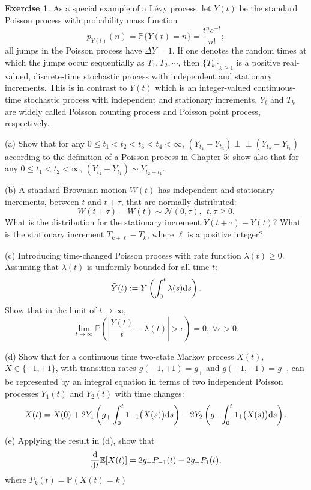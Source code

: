 \documentclass[12pt]{article}
\newcommand{\Prob}{\mathbb{P}}
\newcommand{\Expect}{\mathbb{E}}
\def\rd{{\rm d}}
\theoremstyle{definition}
\newtheorem{exer}{Exercise}
\theoremstyle{remark}
\def\d{{\rm d}}
\begin{document}
\begin{exer}
    As a special example of a L\'{e}vy process,
let $Y(t)$ be the standard Poisson process with probability 
mass function
\[
            p_{Y(t)}(n) =\mathbb{P}\big\{ Y(t) = n\big\} 
          =  \frac{ t^n e^{-t} }{n!};
\]
all jumps in the Poisson process have $\Delta Y = 1$.
If one denotes the random times at which the jumps
occur sequentially as $T_1, T_2,\cdots$, then $\{T_k\}_{k\ge 1}$
is a positive real-valued, discrete-time stochastic process with
independent and stationary increments.  This is in contrast to $Y(t)$ which is an integer-valued continuous-time stochastic process with 
independent and stationary increments.  $Y_t$ and $T_k$ are 
widely called Poisson counting process and Poisson point
process, respectively.

(a) Show that for any $0\le t_1 <  t_2 < t_3 < t_4 < \infty$,
$(Y_{t_4}-Y_{t_3}) \perp \!\!\! \perp (Y_{t_2}-Y_{t_1})$
according to the definition of a Poisson process in Chapter 5;
show also that for any $0\le t_1<t_2<\infty$, 
$(Y_{t_2}-Y_{t_1}) \sim Y_{t_2-t_1}$.

(b)  A standard Brownian motion $W(t)$ has independent and stationary increments, between $t$ and $t+\tau$, that are normally
distributed: 
\[
          W(t+\tau)-W(t) \sim \mathcal{N}(0, \tau),   \  \
            t, \tau \ge 0.
\]
What is the distribution for the stationary increment
$Y(t+\tau)-Y(t)$?  What is the stationary increment 
$T_{k+\ell}-T_k$, where $\ell$ is a positive integer?

(c)  Introducing time-changed Poisson process with 
rate function $\lambda(t)\ge 0$.  Assuming that $\lambda(t)$
is uniformly bounded for all time $t$:
\begin{equation*}
        \tilde{Y}(t) := Y\left(\int_0^t \lambda(s)\rd s\right).
\end{equation*}
Show that in the limit of $t\to\infty$,
\[
  \lim_{t\to\infty} \mathbb{P}\left( \left|
      \frac{\tilde{Y}(t)}{t} - \lambda(t) \right| >\epsilon  \right) 
        = 0, \  \forall \epsilon>0.
\]

(d) Show that for a continuous time two-state Markov process
$X(t)$, $X\in\{-1,+1\}$, with transition rates $g(-1,+1)=g_+$ 
and $g(+1,-1)=g_-$, can be represented by an
integral equation in terms of two independent 
Poisson processes $Y_1(t)$ and $Y_2(t)$ with time changes:
\[
   X(t) = X(0) + 2Y_1\left( g_+\int_0^t \mathbf{1}_{-1}\big(
     X(s)\big) \rd s \right)  - 
               2Y_2\left(g_-\int_0^t \mathbf{1}_{1}\big(
     X(s)\big) \rd s \right).
\]

(e) Applying the result in (d), show that 
\begin{align*}
    \frac{\d }{\d t} \Expect[X(t)]  = 2 g_{+} P_{-1}(t) - 2 g_{-} P_{1}(t),
\end{align*}
where $P_{k}(t) = \Prob(X(t) = k)$

\end{exer}
\end{document}
